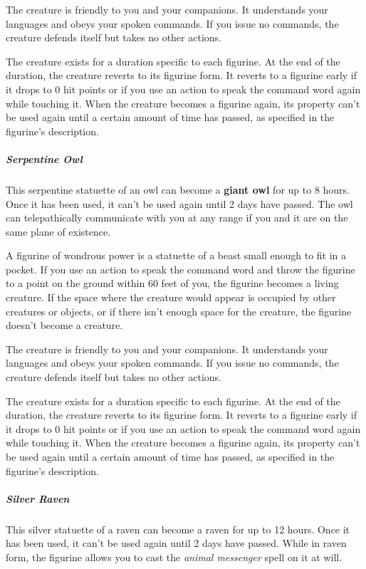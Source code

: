 \documentclass[10pt,a4paper,twoside,bg=print,twocolumn,openany,nodeprecatedcode]{dndbook}
\begin{document}
The creature is friendly to you and your companions. It understands your languages and obeys your spoken commands. If you issue no commands, the creature defends itself but takes no other actions.

The creature exists for a duration specific to each figurine. At the end of the duration, the creature reverts to its figurine form. It reverts to a figurine early if it drops to 0 hit points or if you use an action to speak the command word again while touching it. When the creature becomes a figurine again, its property can't be used again until a certain amount of time has passed, as specified in the figurine's description.

\subparagraph{Serpentine Owl}
This serpentine statuette of an owl can become a \textbf{giant owl} for up to 8 hours. Once it has been used, it can't be used again until 2 days have passed. The owl can telepathically communicate with you at any range if you and it are on the same plane of existence.

A figurine of wondrous power is a statuette of a beast small enough to fit in a pocket. If you use an action to speak the command word and throw the figurine to a point on the ground within 60 feet of you, the figurine becomes a living creature. If the space where the creature would appear is occupied by other creatures or objects, or if there isn't enough space for the creature, the figurine doesn't become a creature.

The creature is friendly to you and your companions. It understands your languages and obeys your spoken commands. If you issue no commands, the creature defends itself but takes no other actions.

The creature exists for a duration specific to each figurine. At the end of the duration, the creature reverts to its figurine form. It reverts to a figurine early if it drops to 0 hit points or if you use an action to speak the command word again while touching it. When the creature becomes a figurine again, its property can't be used again until a certain amount of time has passed, as specified in the figurine's description.

\subparagraph{Silver Raven}
This silver statuette of a raven can become a raven for up to 12 hours. Once it has been used, it can't be used again until 2 days have passed. While in raven form, the figurine allows you to cast the \textit{animal messenger} spell on it at will.
\end{document}
